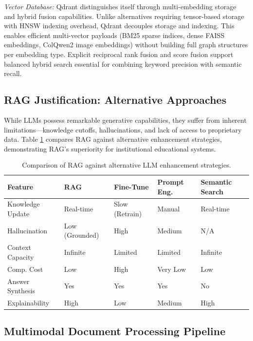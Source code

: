 \documentclass[11pt,a4paper,twocolumn]{article}
\begin{document}
\textit{Vector Database:} Qdrant distinguishes itself through multi-embedding storage and hybrid fusion capabilities. Unlike alternatives requiring tensor-based storage with HNSW indexing overhead, Qdrant decouples storage and indexing. This enables efficient multi-vector payloads (BM25 sparse indices, dense FAISS embeddings, ColQwen2 image embeddings) without building full graph structures per embedding type. Explicit reciprocal rank fusion and score fusion support balanced hybrid search essential for combining keyword precision with semantic recall.

\subsection{RAG Justification: Alternative Approaches}

While LLMs possess remarkable generative capabilities, they suffer from inherent limitations—knowledge cutoffs, hallucinations, and lack of access to proprietary data. Table \ref{tab:rag_comparison} compares RAG against alternative enhancement strategies, demonstrating RAG's superiority for institutional educational systems.

\begin{table}[t]
\caption{Comparison of RAG against alternative LLM enhancement strategies.}
\label{tab:rag_comparison}
\centering
\small
\begin{tabular}{p{2.8cm}p{1.8cm}p{1.8cm}p{1.8cm}p{1.8cm}}
\toprule
\textbf{Feature} & \textbf{RAG} & \textbf{Fine-Tune} & \textbf{Prompt Eng.} & \textbf{Semantic Search} \\
\midrule
Knowledge Update & Real-time & Slow (Retrain) & Manual & Real-time \\
Hallucination & Low (Grounded) & High & Medium & N/A \\
Context Capacity & Infinite & Limited & Limited & Infinite \\
Comp. Cost & Low & High & Very Low & Low \\
Answer Synthesis & Yes & Yes & Yes & No \\
Explainability & High & Low & Medium & High \\
\bottomrule
\end{tabular}
\end{table}

\subsection{Multimodal Document Processing Pipeline}
\end{document}
